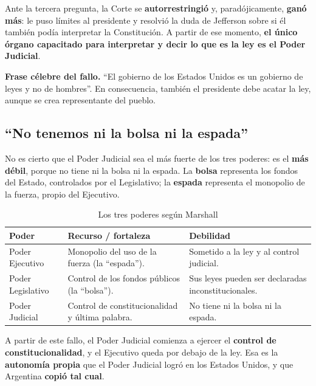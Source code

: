 \documentclass[12pt,oneside]{book}
\begin{document}
Ante la tercera pregunta, la Corte se \textbf{autorrestringió} y, paradójicamente, \textbf{ganó más}: le puso límites al presidente y resolvió la duda de Jefferson sobre si él también podía interpretar la Constitución. A partir de ese momento, \textbf{el único órgano capacitado para interpretar y decir lo que es la ley es el Poder Judicial}.

\begin{important}
\textbf{Frase célebre del fallo.} ``El gobierno de los Estados Unidos es un gobierno de leyes y no de hombres''. En consecuencia, también el presidente debe acatar la ley, aunque se crea representante del pueblo.
\end{important}

\subsection{``No tenemos ni la bolsa ni la espada''}

No es cierto que el Poder Judicial sea el más fuerte de los tres poderes: es el \textbf{más débil}, porque no tiene ni la bolsa ni la espada. La \textbf{bolsa} representa los fondos del Estado, controlados por el Legislativo; la \textbf{espada} representa el monopolio de la fuerza, propio del Ejecutivo.

\begin{table}[H]
\centering
\small
\caption{Los tres poderes según Marshall}
\begin{tabularx}{\textwidth}{Q{0.19\textwidth}YY}
\toprule
\textbf{Poder} & \textbf{Recurso / fortaleza} & \textbf{Debilidad} \\
\midrule
Poder Ejecutivo & Monopolio del uso de la fuerza (la ``espada''). & Sometido a la ley y al control judicial. \\
Poder Legislativo & Control de los fondos públicos (la ``bolsa''). & Sus leyes pueden ser declaradas inconstitucionales. \\
Poder Judicial & Control de constitucionalidad y última palabra. & No tiene ni la bolsa ni la espada. \\
\bottomrule
\end{tabularx}
\end{table}

A partir de este fallo, el Poder Judicial comienza a ejercer el \textbf{control de constitucionalidad}, y el Ejecutivo queda por debajo de la ley. Esa es la \textbf{autonomía propia} que el Poder Judicial logró en los Estados Unidos, y que Argentina \textbf{copió tal cual}.
\end{document}
